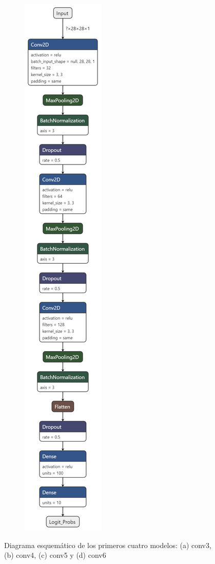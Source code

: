 \documentclass[11pt]{article}
\begin{document}
\begin{figure}[H]
\begin{subfigure}[c]{0.24\textwidth}
        \caption{}
        \label{fig:CNN5}
    \end{subfigure}
    \begin{subfigure}[c]{0.24\textwidth}
        \centering
        \includegraphics[height =  0.95\textheight]{conv6.png}
        \caption{}
        \label{fig:CNN6}
    \end{subfigure}
    \caption{Diagrama esquemático de los primeros cuatro modelos: (a) conv3, (b) conv4, (c) conv5 y (d) conv6}
\end{figure}
\end{document}
